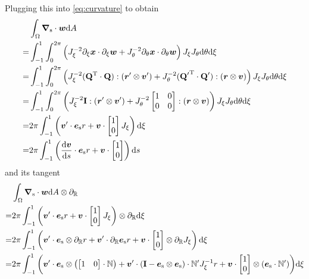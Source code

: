\documentclass[a4paper,11pt]{article}
\newcommand{\ta}[1]{\text{\boldmath $#1$}} %
\newcommand{\ts}[1]{\text{\boldmath $\mathrm{#1}$}} %
\newcommand{\uv}[1]{\mathbb{#1}}
\newcommand{\um}[1]{\mathbb{#1}}
\newcommand{\dif}[1]{\mathrm{d}#1}
\newcommand{\diff}{\ta{\nabla}}
\newcommand{\pderiv}[2]{\partial_{#2} #1}
\newcommand{\dderiv}[2]{\frac{\mathrm{d}#1}{\mathrm{d}#2}}
\newcommand{\T}{\mathrm{T}}
\newcommand{\surf}{\mathrm{s}}
\begin{document}
Plugging this into \eqref{eq:curvature} to obtain
\begin{align}
 &\int_\Omega\diff_\surf\cdot\ta w\dif A\\
=&\int_{-1}^{1}\int_0^{2\pi}\left( J_\xi^{-2} \pderiv{\ta x}{\xi}\cdot\pderiv{\ta w}{\xi} +
                              J_\theta^{-2} \pderiv{\ta x}{\theta}\cdot\pderiv{\ta w}{\theta}
  \right) J_\xi J_\theta \dif \theta \dif \xi\\
=&\int_{-1}^{1}\int_0^{2\pi}\left(
	  J_\xi^{-2} (\ts Q^\T\cdot\ts Q):(\ta r'\otimes \ta v') +
	  J_\theta^{-2} ({\ts Q'}^\T\cdot\ts Q'):(\ta r\otimes\ta v)
  \right) J_\xi J_\theta \dif \theta \dif \xi\\
=&\int_{-1}^{1}\int_0^{2\pi}\left(
	  J_\xi^{-2} \ts I :(\ta r'\otimes \ta v') +
	  J_\theta^{-2} \begin{bmatrix}1&0\\0&0\end{bmatrix}:(\ta r \otimes \ta v)
  \right) J_\xi J_\theta \dif \theta \dif \xi\\
=&2\pi\int_{-1}^{1}\left( \ta v' \cdot \ta e_\surf r + \ta v \cdot \begin{bmatrix}1\\0\end{bmatrix} J_\xi \right) \dif \xi\\
=&2\pi\int_{-1}^{1}\left( \dderiv{\ta v}{s} \cdot \ta e_\surf r + \ta v \cdot \begin{bmatrix}1\\0\end{bmatrix} \right) \dif s
\end{align}
and its tangent
\begin{align}
 &\int_\Omega\diff_\surf\cdot\ta w\dif A \otimes \pderiv{}{\uv R} \\
 =& 2\pi \int_{-1}^{1} \left(
	\ta v' \cdot \ta e_\surf r + \ta v\cdot \begin{bmatrix}1\\0\end{bmatrix} J_\xi
	\right)\otimes\pderiv{}{\uv R}\dif\xi\\
  =& 2\pi \int_{-1}^{1} \left(
	\ta v' \cdot \ta e_\surf \otimes \pderiv{r}{\uv R} + \ta v'\cdot \pderiv{\ta e_\surf}{\uv R} r + \ta v\cdot \begin{bmatrix}1\\0\end{bmatrix}\otimes\pderiv{J_\xi}{\uv R}
	\right)\dif\xi\\
  =& 2\pi \int_{-1}^{1} \bigg(
	\ta v' \cdot \ta e_\surf \otimes\left(\begin{bmatrix}1&0\end{bmatrix}\cdot \um N\right) +
	\ta v'\cdot (\ts I - \ta e_\surf\otimes \ta e_\surf)\cdot \um N' J_\xi^{-1} r
	+\ta v\cdot \begin{bmatrix}1\\0\end{bmatrix}\otimes (\ta e_\surf\cdot \um N')
	\bigg)\dif\xi
\end{align}
\end{document}
